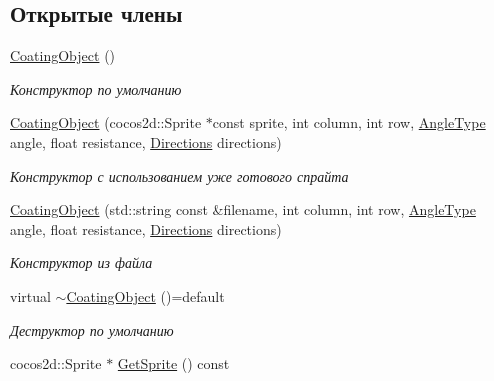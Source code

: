 \subsection*{Открытые члены}
\begin{DoxyCompactItemize}
\item 
\mbox{\label{classrtm_1_1_coating_object_a4b6f326b459b1bbf6b66c08cd74d2f1a}} 
\hyperlink{classrtm_1_1_coating_object_a4b6f326b459b1bbf6b66c08cd74d2f1a}{Coating\+Object} ()
\begin{DoxyCompactList}\small\item\em Конструктор по умолчанию \end{DoxyCompactList}\item 
\hyperlink{classrtm_1_1_coating_object_a4d5d7ecc1ba34ec9f2d29dd39c1c054f}{Coating\+Object} (cocos2d\+::\+Sprite $\ast$const sprite, int column, int row, \hyperlink{namespacertm_a69dc82b16a0148c10962caa83d930f89}{Angle\+Type} angle, float resistance, \hyperlink{namespacertm_a4776fbfe59834ff1a16838ad6735b69a}{Directions} directions)
\begin{DoxyCompactList}\small\item\em Конструктор с использованием уже готового спрайта \end{DoxyCompactList}\item 
\hyperlink{classrtm_1_1_coating_object_ae3cfac6ecad1d4e35a34f80aaf782392}{Coating\+Object} (std\+::string const \&filename, int column, int row, \hyperlink{namespacertm_a69dc82b16a0148c10962caa83d930f89}{Angle\+Type} angle, float resistance, \hyperlink{namespacertm_a4776fbfe59834ff1a16838ad6735b69a}{Directions} directions)
\begin{DoxyCompactList}\small\item\em Конструктор из файла \end{DoxyCompactList}\item 
\mbox{\label{classrtm_1_1_coating_object_aa181401eddb2b9c099c0d56dcbae4d0d}} 
virtual \hyperlink{classrtm_1_1_coating_object_aa181401eddb2b9c099c0d56dcbae4d0d}{$\sim$\+Coating\+Object} ()=default
\begin{DoxyCompactList}\small\item\em Деструктор по умолчанию \end{DoxyCompactList}\item 
cocos2d\+::\+Sprite $\ast$ \hyperlink{classrtm_1_1_coating_object_a5153c2be68353078dac8771cc9c361bb}{Get\+Sprite} () const

\end{DoxyCompactItemize}

